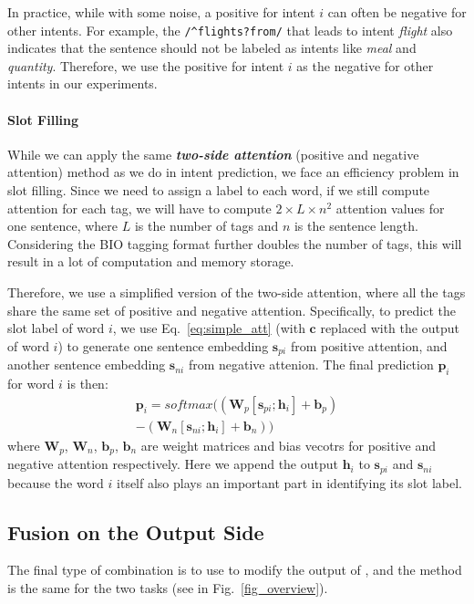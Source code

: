 In practice, while with some noise, a positive \RE for intent $i$ can often be negative \REs for other intents. For example, the \RE \texttt{/\textasciicircum flights?\:from/} that leads to intent \emph{flight} also indicates that the sentence should not be labeled as intents like \emph{meal} and \emph{quantity}.
Therefore, we use the positive \RE for intent $i$ as the negative \REs for other intents in our experiments.

\paragraph{Slot Filling}
While we can apply the same \textbf{\emph{two-side attention}} (positive and negative attention) method as we do in intent prediction, we face an efficiency problem in slot filling.
Since we need to assign a label to each word, if we still compute attention for each tag, we will have to compute $2\times L \times n^2$ attention values for one sentence, where $L$ is the number of tags and $n$ is the sentence length. Considering the BIO tagging format further doubles the number of tags, this will result in a lot of computation and memory storage.

Therefore, we use a simplified version of the two-side attention, where all the tags share the same set of positive and negative attention.
Specifically, to predict the slot label of word $i$, we use Eq.~\ref{eq:simple_att} (with $\textbf{c}$ replaced with the \BLSTM output of word $i$) to generate one sentence embedding $\textbf{s}_{pi}$ from positive attention, and another sentence embedding $\textbf{s}_{ni}$ from negative attenion.
The final prediction $\textbf{p}_i$ for word $i$ is then:
\begin{equation}
\begin{split}
\textbf{p}_i = softmax((\textbf{W}_p [\textbf{s}_{pi}; \textbf{h}_i] + \textbf{b}_p) \\- (\textbf{W}_n [\textbf{s}_{ni}; \textbf{h}_i] + \textbf{b}_n))
\end{split}
\end{equation}
where $\textbf{W}_{p}$, $\textbf{W}_{n}$, $\textbf{b}_{p}$, $\textbf{b}_{n}$ are weight matrices and bias vecotrs for positive and negative attention respectively. Here we append the \BLSTM output $\textbf{h}_i$ to $\textbf{s}_{pi}$ and $\textbf{s}_{ni}$ because the word $i$ itself also plays an important part in identifying its slot label.

\subsection{Fusion on the Output Side}
\label{fusion_with_output}
The final type of combination is to use \RE to modify the output of \NN, and the method is the same for the two tasks (see  in Fig.~\ref{fig_overview}).

